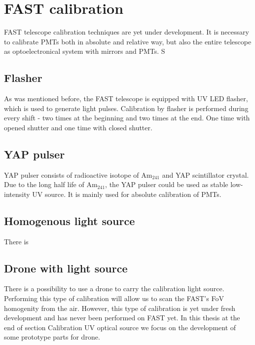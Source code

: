 \section{FAST calibration}
FAST telescope calibration techniques are yet under development. It is necessary to calibrate PMTs both in absolute and relative way, but also the entire telescope as optoelectronical system with mirrors and PMTs. S 
\subsection{Flasher}
As was mentioned before, the FAST telescope is equipped with UV LED flasher, which is used to generate light pulses. Calibration by flasher is performed during every shift - two times at the beginning and two times at the end. One time with opened shutter and one time with closed shutter. 
\subsection{YAP pulser}
YAP pulser consists of radioactive isotope of $\textrm{Am}_{241}$ and YAP scintillator crystal. Due to the long half life of $\textrm{Am}_{241}$, the YAP pulser could be used as stable low-intensity UV source. 
It is mainly used for absolute calibration of PMTs.

\subsection{Homogenous light source}
There is 


\subsection{Drone with light source}
There is a possibility to use a drone to carry the calibration light source. Performing this type of calibration will allow us to scan the FAST's FoV homogenity from the air. However, this type of calibration is yet under fresh development and has never been performed on FAST yet. In this thesis at the end of section Calibration UV optical source we focus on the development of some prototype parts for drone.





